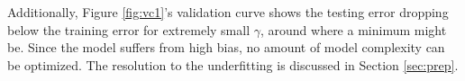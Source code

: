 Additionally, Figure \ref{fig:vc1}'s validation curve shows the testing error
dropping below the training error for extremely small $\gamma$, around where a
minimum might be.  Since the model suffers from high bias, no amount of model
complexity can be optimized. The resolution to the underfitting is discussed in
Section \ref{sec:prep}.


